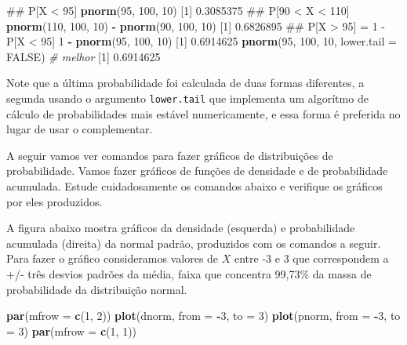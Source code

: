 \documentclass[10pt,a4paper]{book}
\newenvironment{Shaded}{\begin{snugshade}}{\end{snugshade}}
\newcommand{\KeywordTok}[1]{\textcolor[rgb]{0.13,0.29,0.53}{\textbf{#1}}}
\newcommand{\DataTypeTok}[1]{\textcolor[rgb]{0.13,0.29,0.53}{#1}}
\newcommand{\DecValTok}[1]{\textcolor[rgb]{0.00,0.00,0.81}{#1}}
\newcommand{\FloatTok}[1]{\textcolor[rgb]{0.00,0.00,0.81}{#1}}
\newcommand{\StringTok}[1]{\textcolor[rgb]{0.31,0.60,0.02}{#1}}
\newcommand{\CommentTok}[1]{\textcolor[rgb]{0.56,0.35,0.01}{\textit{#1}}}
\newcommand{\OtherTok}[1]{\textcolor[rgb]{0.56,0.35,0.01}{#1}}
\newcommand{\OperatorTok}[1]{\textcolor[rgb]{0.81,0.36,0.00}{\textbf{#1}}}
\newcommand{\NormalTok}[1]{#1}
\begin{document}
\begin{Shaded}
\begin{Highlighting}[]
\NormalTok{## P[X < 95]}
\KeywordTok{pnorm}\NormalTok{(}\DecValTok{95}\NormalTok{, }\DecValTok{100}\NormalTok{, }\DecValTok{10}\NormalTok{)}
\NormalTok{[}\DecValTok{1}\NormalTok{] }\FloatTok{0.3085375}
\NormalTok{## P[90 < X < 110]}
\KeywordTok{pnorm}\NormalTok{(}\DecValTok{110}\NormalTok{, }\DecValTok{100}\NormalTok{, }\DecValTok{10}\NormalTok{) }\OperatorTok{-}\StringTok{ }\KeywordTok{pnorm}\NormalTok{(}\DecValTok{90}\NormalTok{, }\DecValTok{100}\NormalTok{, }\DecValTok{10}\NormalTok{)}
\NormalTok{[}\DecValTok{1}\NormalTok{] }\FloatTok{0.6826895}
\NormalTok{## P[X > 95] = 1 - P[X < 95]}
\DecValTok{1} \OperatorTok{-}\StringTok{ }\KeywordTok{pnorm}\NormalTok{(}\DecValTok{95}\NormalTok{, }\DecValTok{100}\NormalTok{, }\DecValTok{10}\NormalTok{)}
\NormalTok{[}\DecValTok{1}\NormalTok{] }\FloatTok{0.6914625}
\KeywordTok{pnorm}\NormalTok{(}\DecValTok{95}\NormalTok{, }\DecValTok{100}\NormalTok{, }\DecValTok{10}\NormalTok{, }\DataTypeTok{lower.tail =} \OtherTok{FALSE}\NormalTok{) }\CommentTok{# melhor}
\NormalTok{[}\DecValTok{1}\NormalTok{] }\FloatTok{0.6914625}
\end{Highlighting}
\end{Shaded}

Note que a última probabilidade foi calculada de duas formas diferentes,
a segunda usando o argumento \texttt{lower.tail} que implementa um
algorítmo de cálculo de probabilidades mais estável numericamente, e
essa forma é preferida no lugar de usar o complementar.

A seguir vamos ver comandos para fazer gráficos de distribuições de
probabilidade. Vamos fazer gráficos de funções de densidade e de
probabilidade acumulada. Estude cuidadosamente os comandos abaixo e
verifique os gráficos por eles produzidos.

A figura abaixo mostra gráficos da densidade (esquerda) e probabilidade
acumulada (direita) da normal padrão, produzidos com os comandos a
seguir. Para fazer o gráfico consideramos valores de \(X\) entre -3 e 3
que correspondem a +/- três desvios padrões da média, faixa que
concentra 99,73\% da massa de probabilidade da distribuição normal.

\begin{Shaded}
\begin{Highlighting}[]
\KeywordTok{par}\NormalTok{(}\DataTypeTok{mfrow =} \KeywordTok{c}\NormalTok{(}\DecValTok{1}\NormalTok{, }\DecValTok{2}\NormalTok{))}
\KeywordTok{plot}\NormalTok{(dnorm, }\DataTypeTok{from =} \OperatorTok{-}\DecValTok{3}\NormalTok{, }\DataTypeTok{to =} \DecValTok{3}\NormalTok{)}
\KeywordTok{plot}\NormalTok{(pnorm, }\DataTypeTok{from =} \OperatorTok{-}\DecValTok{3}\NormalTok{, }\DataTypeTok{to =} \DecValTok{3}\NormalTok{)}
\KeywordTok{par}\NormalTok{(}\DataTypeTok{mfrow =} \KeywordTok{c}\NormalTok{(}\DecValTok{1}\NormalTok{, }\DecValTok{1}\NormalTok{))}
\end{Highlighting}
\end{Shaded}
\end{document}
